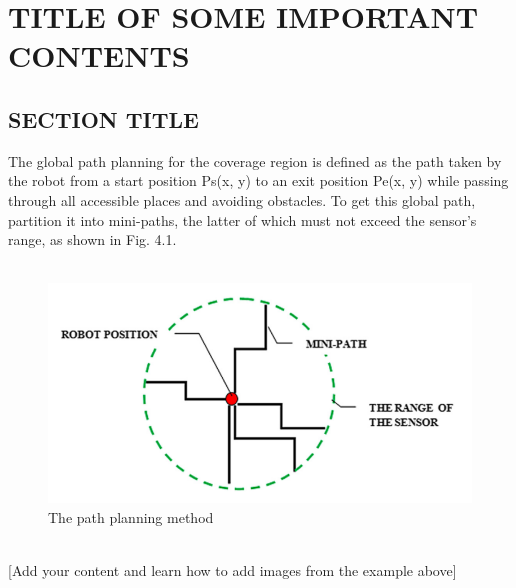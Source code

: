 \chapter{\texorpdfstring{\centering \textbf{\MakeUppercase{Title of Some Important contents}}}{Title of Some Important Contents}}
\section{\textbf{\MakeUppercase{Section Title}}}

The global path planning for the coverage region is defined as the path taken by the robot from a start position Ps(x, y) to an exit position Pe(x, y) while passing through all accessible places and avoiding obstacles. To get this global path, partition it into mini-paths, the latter of which must not exceed the sensor's range, as shown in Fig. 4.1.\\
\\\begin{figure}[htb]
\centering
\includegraphics[scale=0.5]{fig4.1.png} %
\caption{\texttt{}The path planning method\texttt{}}
\label{fig:label} %
\end{figure}\\

[Add your content and learn how to add images from the example  above]

